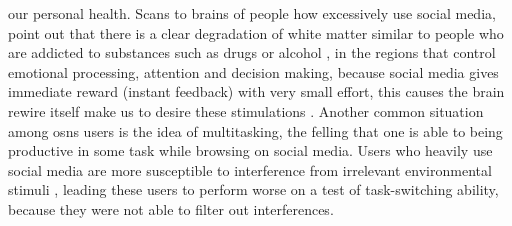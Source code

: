 our personal health. Scans to brains of people how excessively use social media, point out that there is a clear degradation of white matter similar to people who are addicted to substances such as drugs or alcohol \citep{lin2012abnormal}, in the regions that control emotional processing, attention and decision making, because social media gives immediate reward (instant feedback) with very small effort, this causes the brain rewire itself make us to desire these stimulations \citep{berridge1998role}. Another common situation among \glspl{osn} users is the idea of multitasking, the felling that one is able to being productive in some task while browsing on social media. Users who heavily use social media are more susceptible to interference from irrelevant environmental stimuli \citep{ophir2009cognitive}, leading these users to perform worse on a test of task-switching ability, because they were not able to filter out interferences.
